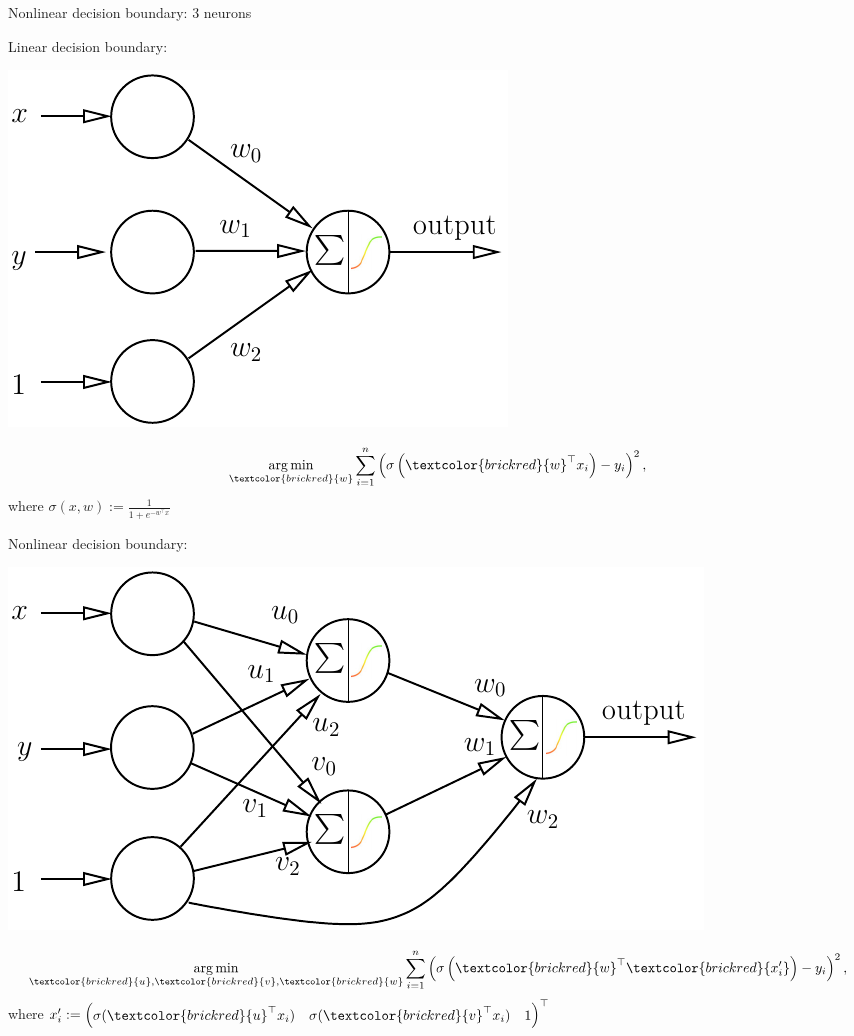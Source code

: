\documentclass[UKenglish,aspectratio=169]{beamer}
\DeclareMathOperator*{\argmin}{arg\,min}
\newcommand\unknown[1]{\textcolor{brickred}{#1}}
\begin{document}
\begin{frame}{Nonlinear decision boundary: 3 neurons}
\begin{minipage}[t]{.4\linewidth}
\strut\vspace*{-\baselineskip}\newline
Linear decision boundary:\\
\centerline{\includegraphics[width=.9\linewidth]{../manuscript/img/neuron2.pdf}}
$$
\argmin\limits_{\unknown{w}} \sum_{i=1}^{n} \left(\sigma\left(\unknown{w}^\top x_i\right) - y_i\right)^2,
$$
where $\sigma(x,w) := \frac{1}{1+e^{-w^\top x}}$
\end{minipage}
\hspace{.05\linewidth}
\pause
\begin{minipage}[t]{.5\linewidth}
\strut\vspace*{-\baselineskip}\newline
Nonlinear decision boundary:\\
\centerline{\includegraphics[width=\linewidth]{../manuscript/img/3neurons.pdf}}
$$
\argmin\limits_{\unknown{u}, \unknown{v}, \unknown{w}} \sum_{i=1}^{n} \left(\sigma\left(\unknown{w}^\top \unknown{x'_i}\right) - y_i\right)^2,
$$
where $x'_i :=  \begin{pmatrix} \sigma(\unknown{u}^\top x_i) &  \sigma(\unknown{v}^\top x_i) & 1\end{pmatrix}^\top$
\end{minipage}
\end{frame}
\end{document}
